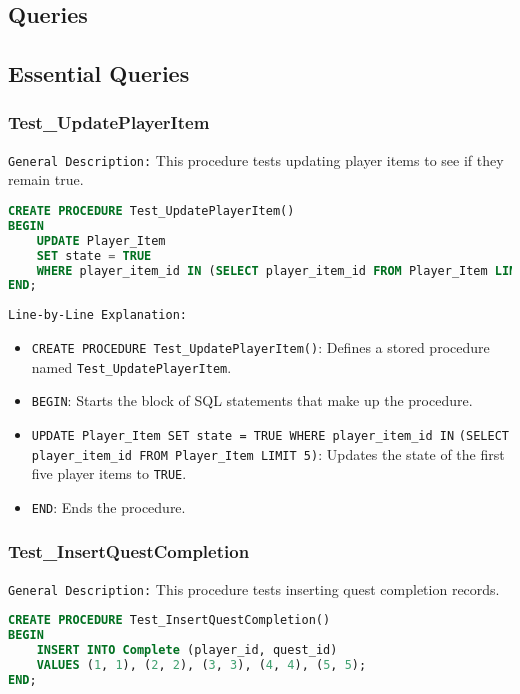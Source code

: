 \documentclass{article}
\begin{document}
\subsection{Queries}

\subsection{Essential Queries}

\subsubsection{Test\_UpdatePlayerItem}

\texttt{General Description:} This procedure tests updating player items to see if they remain true.

\begin{lstlisting}[language=SQL]
CREATE PROCEDURE Test_UpdatePlayerItem()
BEGIN
    UPDATE Player_Item
    SET state = TRUE
    WHERE player_item_id IN (SELECT player_item_id FROM Player_Item LIMIT 5);
END;
\end{lstlisting}

\texttt{Line-by-Line Explanation:}
\begin{itemize}
    \item \lstinline|CREATE PROCEDURE Test_UpdatePlayerItem()|: Defines a stored procedure named \linebreak \lstinline|Test_UpdatePlayerItem|.
    \item \lstinline|BEGIN|: Starts the block of SQL statements that make up the procedure.
    \item \lstinline|UPDATE Player_Item SET state = TRUE WHERE player_item_id IN| \linebreak \lstinline|(SELECT player_item_id FROM Player_Item LIMIT 5)|: Updates the state of the first five player items to \lstinline|TRUE|.
    \item \lstinline|END|: Ends the procedure.
\end{itemize}

\subsubsection{Test\_InsertQuestCompletion}

\texttt{General Description:} This procedure tests inserting quest completion records.

\begin{lstlisting}[language=SQL]
CREATE PROCEDURE Test_InsertQuestCompletion()
BEGIN
    INSERT INTO Complete (player_id, quest_id)
    VALUES (1, 1), (2, 2), (3, 3), (4, 4), (5, 5);
END;
\end{lstlisting}
\end{document}
